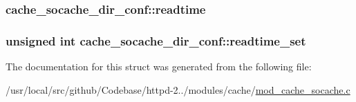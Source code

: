 \subsubsection[{\texorpdfstring{readtime}{readtime}}]{ cache\+\_\+socache\+\_\+dir\+\_\+conf\+::readtime}\hypertarget{structcache__socache__dir__conf_a0ea9c51e40b1846bec92a6aeb79b5a06}{}\label{structcache__socache__dir__conf_a0ea9c51e40b1846bec92a6aeb79b5a06}
\subsubsection[{\texorpdfstring{readtime\+\_\+set}{readtime_set}}]{\setlength{\rightskip}{0pt plus 5cm}unsigned {\bf int} cache\+\_\+socache\+\_\+dir\+\_\+conf\+::readtime\+\_\+set}\hypertarget{structcache__socache__dir__conf_ade44dc9d932fe0940686de053702a4c4}{}\label{structcache__socache__dir__conf_ade44dc9d932fe0940686de053702a4c4}


The documentation for this struct was generated from the following file\+:\begin{DoxyCompactItemize}
\item 
/usr/local/src/github/\+Codebase/httpd-\/2../modules/cache/\hyperlink{modules_2cache_2mod__cache__socache_8c}{mod\+\_\+cache\+\_\+socache.\+c}\end{DoxyCompactItemize}
